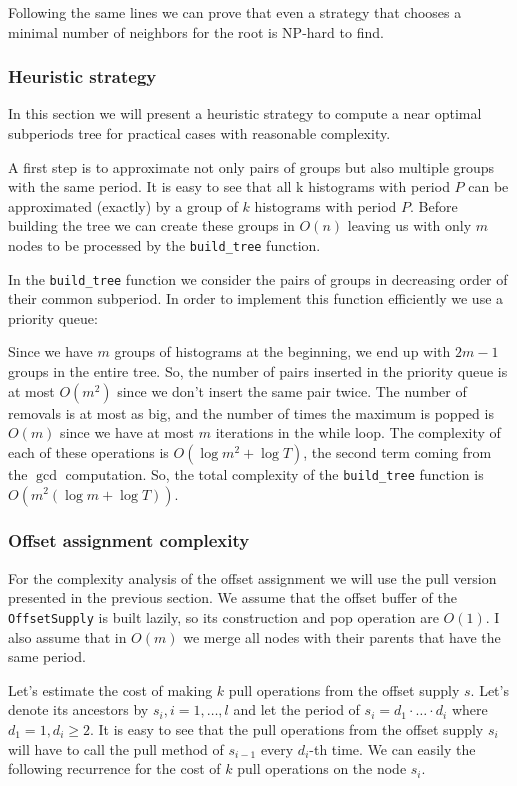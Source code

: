Following the same lines we can prove that even a strategy that chooses a minimal number of neighbors for the root is NP-hard to find.

\subsubsection*{Heuristic strategy}

In this section we will present a heuristic strategy to compute a near optimal subperiods tree for practical cases with reasonable complexity. 

A first step is to approximate not only pairs of groups but also multiple groups with the same period. It is easy to see that all k histograms with period $P$ can be approximated (exactly) by a group of $k$ histograms with period $P$. Before building the tree we can create these groups in $O(n)$ leaving us with only $m$ nodes to be processed by the \verb+build_tree+ function. 

In the \verb+build_tree+ function we consider the pairs of groups in decreasing order of their common subperiod. In order to implement this function efficiently we use a priority queue:



Since we have $m$ groups of histograms at the beginning, we end up with $2m-1$ groups in the entire tree. So, the number of pairs inserted in the priority queue is at most $O(m^2)$ since we don’t insert the same pair twice. The number of removals is at most as big, and the number of times the maximum is popped is $O(m)$ since we have at most $m$ iterations in the while loop. The complexity of each of these operations is $O(\log m^2+\log T)$, the second term coming from the $\gcd$ computation. So, the total complexity of the \verb+build_tree+ function is $O(m^2(\log m + \log T))$. 

\subsubsection*{Offset assignment complexity}

For the complexity analysis of the offset assignment we will use the pull version presented in the previous section. We assume that the offset buffer of the \verb+OffsetSupply+ is built lazily, so its construction and pop operation are $O(1)$. I also assume that in $O(m)$ we merge all nodes with their parents that have the same period.

Let’s estimate the cost of making $k$ pull operations from the offset supply $s$. Let’s denote its ancestors by $s_i,i=1,\ldots,l$ and let the period of $s_i=d_1\cdot\ldots\cdot d_i$ where $d_1=1, d_i \geq 2$. It is easy to see that the pull operations from the offset supply $s_i$ will have to call the pull method of $s_{i-1}$ every $d_i$-th time. We can easily the following recurrence for the cost of $k$ pull operations on the node $s_i$.

